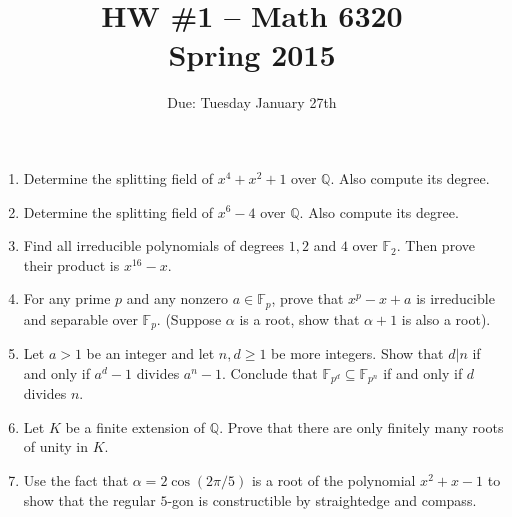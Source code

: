 \documentclass[11pt]{amsart}
\theoremstyle{theorem}
\newcommand{\bF}{\mathbb{F}}
\newcommand{\bQ}{\mathbb{Q}}
\begin{document}
\title{HW \#1 -- Math 6320\\Spring 2015}
\author{Due: Tuesday January 27th}
\maketitle

\begin{enumerate}
\item Determine the splitting field of $x^4+x^2+1$ over $\bQ$.  Also compute its degree.
\item Determine the splitting field of $x^6-4$ over $\bQ$.  Also compute its degree.
\item Find all irreducible polynomials of degrees $1,2$ and $4$ over $\bF_2$.  Then prove their product is $x^{16} - x$.  
\item For any prime $p$ and any nonzero $a \in \bF_p$, prove that $x^p - x + a$ is irreducible and separable over $\bF_p$.  (Suppose $\alpha$ is a root, show that $\alpha+1$ is also a root).  
\item Let $a > 1$ be an integer and let $n,d \geq 1$ be more integers.  Show that $d | n$ if and only if $a^d - 1$ divides $a^n-1$.  Conclude that $\bF_{p^d} \subseteq \bF_{p^n}$ if and only if $d$ divides $n$.  
\item Let $K$ be a finite extension of $\bQ$.  Prove that there are only finitely many roots of unity in $K$.  
\item Use the fact that $\alpha = 2 \cos(2\pi/5)$ is a root of the polynomial $x^2 + x - 1$ to show that the regular $5$-gon is constructible by straightedge and compass.  
\end{enumerate}
\end{document}
